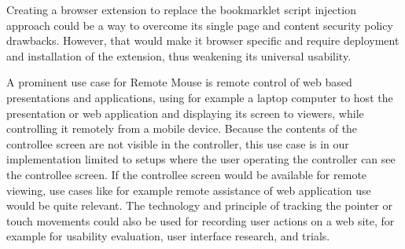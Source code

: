 \documentclass[a4paper,english,twocolumn]{article}
\begin{document}
Creating a browser extension to replace the bookmarklet script
injection approach could be a way to overcome its single page and
content security policy drawbacks. However, that would make it browser
specific and require deployment and installation of the extension,
thus weakening its universal usability.

A prominent use case for Remote Mouse is remote control of web based
presentations and applications, using for example a laptop computer to
host the presentation or web application and displaying its screen to
viewers, while controlling it remotely from a mobile device. Because
the contents of the controllee screen are not visible in the
controller, this use case is in our implementation limited to setups
where the user operating the controller can see the controllee
screen. If the controllee screen would be available for remote
viewing, use cases like for example remote assistance of web
application use would be quite relevant. The technology and principle
of tracking the pointer or touch movements could also be used for
recording user actions on a web site, for example for usability
evaluation, user interface research, and trials.






\end{document}
